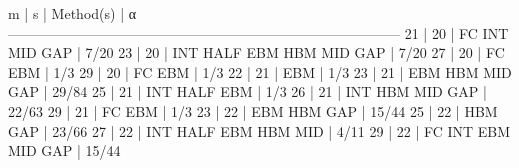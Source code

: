   m    |   s    |                   Method(s)                  |        α        
------------------------------------------------------------------------------------   
21    |  20    |    FC  INT                  MID  GAP         | 7/20   
23    |  20    |        INT  HALF  EBM  HBM  MID  GAP         | 7/20   
27    |  20    |    FC             EBM                        | 1/3   
29    |  20    |    FC             EBM                        | 1/3   
22    |  21    |                   EBM                        | 1/3   
23    |  21    |                   EBM  HBM  MID  GAP         | 29/84   
25    |  21    |        INT  HALF  EBM                        | 1/3   
26    |  21    |        INT             HBM  MID  GAP         | 22/63   
29    |  21    |    FC             EBM                        | 1/3   
23    |  22    |                   EBM  HBM       GAP         | 15/44   
25    |  22    |                        HBM       GAP         | 23/66   
27    |  22    |        INT  HALF  EBM  HBM  MID              | 4/11   
29    |  22    |    FC  INT        EBM       MID  GAP         | 15/44
